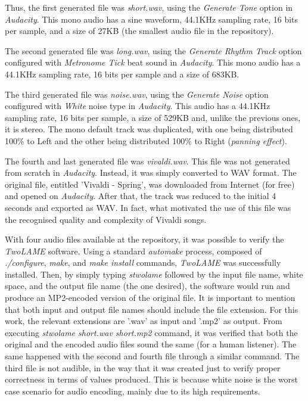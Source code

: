 Thus, the first generated file was \textit{short.wav}, using the \textit{Generate Tone} option in \textit{Audacity}. This mono audio has a sine waveform, 44.1KHz sampling rate, 16 bits per sample, and a size of 27KB (the smallest audio file in the repository).

The second generated file was \textit{long.wav}, using the \textit{Generate Rhythm Track} option configured with \textit{Metronome Tick} beat sound in \textit{Audacity}. This mono audio has a 44.1KHz sampling rate, 16 bits per sample and a size of 683KB.

The third generated file was \textit{noise.wav}, using the \textit{Generate Noise} option configured with \textit{White} noise type in \textit{Audacity}. This audio has a 44.1KHz sampling rate, 16 bits per sample, a size of 529KB and, unlike the previous ones, it is stereo. The mono default track was duplicated, with one being distributed 100\% to Left and the other being distributed 100\% to Right (\textit{panning effect}).

The fourth and last generated file was \textit{vivaldi.wav}. This file was not generated from scratch in \textit{Audacity}. Instead, it was simply converted to WAV format. The original file, entitled 'Vivaldi - Spring', was downloaded from Internet (for free) and opened on \textit{Audacity}. After that, the track was reduced to the initial 4 seconds and exported as WAV. In fact, what motivated the use of this file was the recognised quality and complexity of Vivaldi songs.

With four audio files available at the repository, it was possible to verify the \textit{TwoLAME} software. Using a standard \textit{automake} process, composed of \textit{./configure}, \textit{make}, and \textit{make install} commands, \textit{TwoLAME} was successfully installed. Then, by simply typing \textit{stwolame} followed by the input file name, white space, and the output file name (the one desired), the software would run and produce an MP2-encoded version of the original file.
It is important to mention that both input and output file names should include the file extension. For this work, the relevant extensions are '.wav' as input and '.mp2' as output.
From executing \textit{stwolame short.wav short.mp2} command, it was verified that both the original and the encoded audio files sound the same (for a human listener). The same happened with the second and fourth file through a similar command. 
The third file is not audible, in the way that it was created just to verify proper correctness in terms of values produced. This is because white noise is the worst case scenario for audio encoding, mainly due to its high requirements. \\


